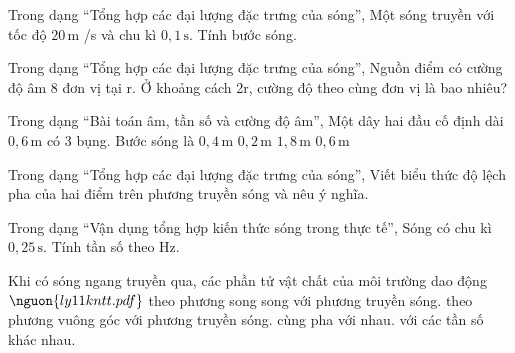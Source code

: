 \begin{bt}
Trong dạng “Tổng hợp các đại lượng đặc trưng của sóng”, Một sóng truyền với tốc độ $20\,\text{m}$ /s và chu kì $0,1\,\text{s}$. Tính bước sóng.
\end{bt}

\begin{ex}
Trong dạng “Tổng hợp các đại lượng đặc trưng của sóng”, Nguồn điểm có cường độ âm 8 đơn vị tại r. Ở khoảng cách 2r, cường độ theo cùng đơn vị là bao nhiêu?
\end{ex}

\begin{ex}
Trong dạng “Bài toán âm, tần số và cường độ âm”, Một dây hai đầu cố định dài $0,6\,\text{m}$ có 3 bụng. Bước sóng là
\choice
{\True $0,4\,\text{m}$}
{$0,2\,\text{m}$}
{$1,8\,\text{m}$}
{$0,6\,\text{m}$}
\end{ex}

\begin{ex}
Trong dạng “Tổng hợp các đại lượng đặc trưng của sóng”, Viết biểu thức độ lệch pha của hai điểm trên phương truyền sóng và nêu ý nghĩa.
\choiceTF

\end{ex}

\begin{ex}
Trong dạng “Vận dụng tổng hợp kiến thức sóng trong thực tế”, Sóng có chu kì $0,25\,\text{s}$. Tính tần số theo Hz.
\end{ex}

\begin{ex}
Khi có sóng ngang truyền qua, các phần tử vật chất của môi trường dao động $\nguon{ly11 kntt.pdf}$
\choice
{theo phương song song với phương truyền sóng.}
{\True theo phương vuông góc với phương truyền sóng.}
{cùng pha với nhau.}
{với các tần số khác nhau.}
\end{ex}

